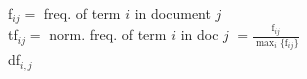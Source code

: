\documentclass[12pt,landscape,a4paper]{article}
\begin{document}
\small
\begin{multicols*}{3}
\begin{flushleft}

f$_{ij} =$ freq. of term $i$ in document $j$ \\[10pt]
tf$_{ij} =$ norm. freq. of term $i$ in doc $j$ $= \frac {\text{f}_{ij}} {\max_i\{\text{f}_{ij}\}}$ \\[10pt]
df$_{i,j}$

\end{flushleft}
\end{multicols*}
\end{document}
